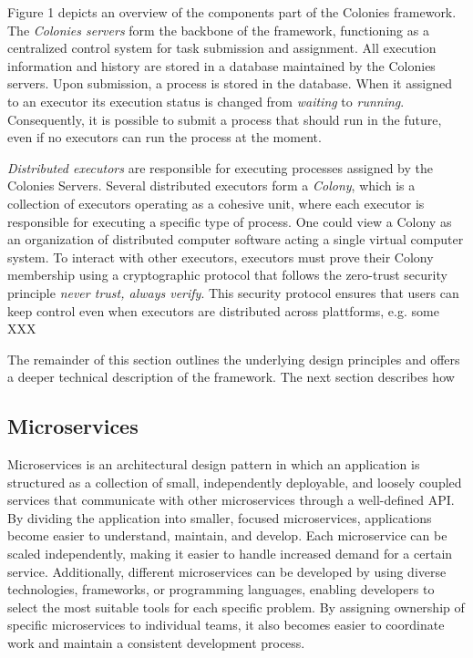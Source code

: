 \documentclass{article}
\begin{document}
Figure 1 depicts an overview of the components part of the Colonies framework. The \emph{Colonies servers} form the backbone of the framework, functioning as a centralized control system for task submission and assignment. All execution information and history are stored in a database maintained by the Colonies servers. Upon submission, a process is stored in the database. When it assigned to an executor its execution status is changed from \emph{waiting} to \emph{running}. Consequently, it is possible to submit a process that should run in the future, even if no executors can run the process at the moment.

\emph{Distributed executors} are responsible for executing processes assigned by the Colonies Servers. Several distributed executors form a \emph{Colony}, which is a collection of executors operating as a cohesive unit, where each executor is responsible for executing a specific type of process. One could view a Colony as an organization of distributed computer software acting a single virtual computer system. To interact with other executors, executors must prove their Colony membership using a cryptographic protocol that follows the zero-trust security principle \emph{never trust, always verify}. This security protocol ensures that users can keep control even when executors are distributed across plattforms, e.g. some  XXX

The remainder of this section outlines the underlying design principles and offers a deeper technical description of the framework. The next section describes how 

\subsection{Microservices}
Microservices is an architectural design pattern in which an application is structured as a collection of small, independently deployable, and loosely coupled services that communicate with other microservices through a well-defined API. By dividing the application into smaller, focused microservices, applications become easier to understand, maintain, and develop. Each microservice can be scaled independently, making it easier to handle increased demand for a certain service. Additionally, different microservices can be developed by using diverse technologies, frameworks, or programming languages, enabling developers to select the most suitable tools for each specific problem. By assigning ownership of specific microservices to individual teams, it also becomes easier to coordinate work and maintain a consistent development process.
\end{document}
